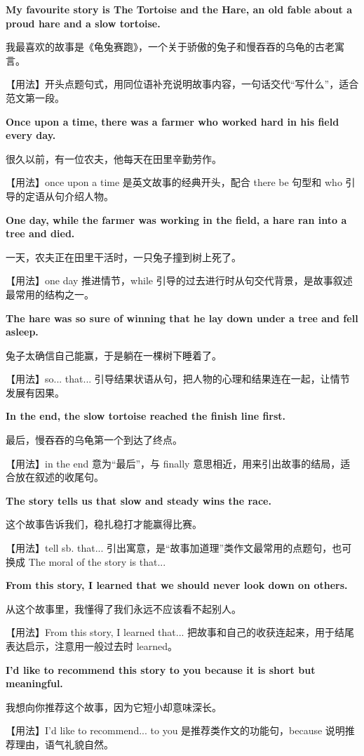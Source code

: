 \documentclass[UTF8,a4paper,11pt,oneside]{ctexbook}
\newcommand{\fansection}[1]{%
  \par\addvspace{2.4ex}%
  \Needspace{6\baselineskip}%
  \noindent{\sffamily\Large\bfseries\color{mainblue}#1}\par
  \nopagebreak
  \addvspace{0.2ex}%
  \noindent{\color{rulelight}\rule{\linewidth}{0.9pt}}\par
  \addvspace{0.9ex}%
  \nobreak
}
\newcommand{\fanpat}[3]{%
  \item{\bfseries #1}\par\nopagebreak
  {\small\color{textgray}#2}\par\nopagebreak
  {\footnotesize\color{accent!90!black}【用法】#3}\par
}
\begin{document}
\fansection{〇、本单元写作常用句型}
\begin{fanpatterns}
\fanpat{My favourite story is The Tortoise and the Hare, an old fable about a proud hare and a slow tortoise.}{我最喜欢的故事是《龟兔赛跑》，一个关于骄傲的兔子和慢吞吞的乌龟的古老寓言。}{开头点题句式，用同位语补充说明故事内容，一句话交代“写什么”，适合范文第一段。}

\fanpat{Once upon a time, there was a farmer who worked hard in his field every day.}{很久以前，有一位农夫，他每天在田里辛勤劳作。}{once upon a time 是英文故事的经典开头，配合 there be 句型和 who 引导的定语从句介绍人物。}

\fanpat{One day, while the farmer was working in the field, a hare ran into a tree and died.}{一天，农夫正在田里干活时，一只兔子撞到树上死了。}{one day 推进情节，while 引导的过去进行时从句交代背景，是故事叙述最常用的结构之一。}

\fanpat{The hare was so sure of winning that he lay down under a tree and fell asleep.}{兔子太确信自己能赢，于是躺在一棵树下睡着了。}{so... that... 引导结果状语从句，把人物的心理和结果连在一起，让情节发展有因果。}

\fanpat{In the end, the slow tortoise reached the finish line first.}{最后，慢吞吞的乌龟第一个到达了终点。}{in the end 意为“最后”，与 finally 意思相近，用来引出故事的结局，适合放在叙述的收尾句。}

\fanpat{The story tells us that slow and steady wins the race.}{这个故事告诉我们，稳扎稳打才能赢得比赛。}{tell sb. that... 引出寓意，是“故事加道理”类作文最常用的点题句，也可换成 The moral of the story is that...}

\fanpat{From this story, I learned that we should never look down on others.}{从这个故事里，我懂得了我们永远不应该看不起别人。}{From this story, I learned that... 把故事和自己的收获连起来，用于结尾表达启示，注意用一般过去时 learned。}

\fanpat{I'd like to recommend this story to you because it is short but meaningful.}{我想向你推荐这个故事，因为它短小却意味深长。}{I'd like to recommend... to you 是推荐类作文的功能句，because 说明推荐理由，语气礼貌自然。}

\end{fanpatterns}

\fansection{一、满分范文}
\end{document}
